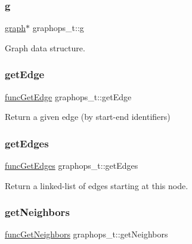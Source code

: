 \mbox{\label{structgraphops__t_ab8a78cf4f0bdfe6a65aa217a716ca537}} 
\subsubsection{\texorpdfstring{g}{g}}
{\footnotesize\ttfamily \hyperlink{graphdata_8h_ad149912e738dca1c84b3b4508382fff5}{graph}$\ast$ graphops\+\_\+t\+::g}



Graph data structure. 

\mbox{\label{structgraphops__t_aafbe3ec7bdce040b86d7748c953cf607}} 
\subsubsection{\texorpdfstring{get\+Edge}{getEdge}}
{\footnotesize\ttfamily \hyperlink{graphops_8h_aed109d4861cfae4ea7721603770befca}{func\+Get\+Edge} graphops\+\_\+t\+::get\+Edge}



Return a given edge (by start-\/end identifiers) 

\mbox{\label{structgraphops__t_a87fec7e1150c05e54e34ab09fe401eaa}} 
\subsubsection{\texorpdfstring{get\+Edges}{getEdges}}
{\footnotesize\ttfamily \hyperlink{graphops_8h_af1e618623a0855f489ac957e5ae24ac0}{func\+Get\+Edges} graphops\+\_\+t\+::get\+Edges}



Return a linked-\/list of edges starting at this node. 

\mbox{\label{structgraphops__t_ac6c5bec2f102e4da5959cc3db66ac3c6}} 
\subsubsection{\texorpdfstring{get\+Neighbors}{getNeighbors}}
{\footnotesize\ttfamily \hyperlink{graphops_8h_a201169542b84db39bcb68ae94223e773}{func\+Get\+Neighbors} graphops\+\_\+t\+::get\+Neighbors}



